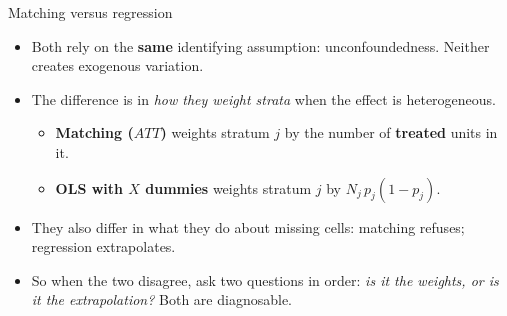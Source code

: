\documentclass[
  11pt,
  ignorenonframetext,
  aspectratio=169,
]{beamer}
\providecommand{\tightlist}{%
  \setlength{\itemsep}{0pt}\setlength{\parskip}{0pt}}
\begin{document}
\begin{frame}{Matching versus regression}
\protect{}\label{matching-versus-regression}
\begin{itemize}
\tightlist
\item
  Both rely on the \textbf{same} identifying assumption:
  unconfoundedness. Neither creates exogenous variation.
\item
  The difference is in \emph{how they weight strata} when the effect is
  heterogeneous.

  \begin{itemize}
  \tightlist
  \item
    \textbf{Matching (\(ATT\))} weights stratum \(j\) by the number of
    \textbf{treated} units in it.
  \item
    \textbf{OLS with \(X\) dummies} weights stratum \(j\) by
    \(N_j\, p_j (1-p_j)\).
  \end{itemize}
\item
  They also differ in what they do about missing cells: matching
  refuses; regression extrapolates.
\item
  So when the two disagree, ask two questions in order: \emph{is it the
  weights, or is it the extrapolation?} Both are diagnosable.
\end{itemize}
\end{frame}
\end{document}
